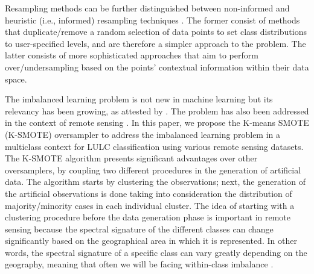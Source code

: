 \documentclass[remotesensing,article,submit,moreauthors,pdftex]{Definitions/mdpi}
\begin{document}
Resampling methods can be further distinguished between non-informed and
heuristic (i.e., informed) resampling techniques
\cite{Fernandez2013,Luengo2020,Garcia2016}. The former consist of methods that
duplicate/remove a random selection of data points to set class distributions to
user-specified levels, and are therefore a simpler approach to the problem. The
latter consists of more sophisticated approaches that aim to perform
over/undersampling based on the points' contextual information within their data
space.

The imbalanced learning problem is not new in machine learning but its
relevancy has been growing, as attested by \cite{Haixiang2017}. The problem
has also been addressed in the context of remote sensing \cite{Douzas2019rs}.
In this paper, we propose the K-means SMOTE (K-SMOTE) \cite{Douzas2018}
oversampler to address the imbalanced learning problem in a multiclass context
for LULC classification using various remote sensing datasets. The K-SMOTE
algorithm presents significant advantages over other oversamplers, by coupling
two different procedures in the generation of artificial data. The algorithm
starts by clustering the observations; next, the generation of the artificial
observations is done taking into consideration the distribution of
majority/minority cases in each individual cluster. The idea of starting with
a clustering procedure before the data generation phase is important in
remote sensing because the spectral signature of the different classes can
change significantly based on the geographical area in which it is represented.
In other words, the spectral signature of a specific class can vary greatly
depending on the geography, meaning that often we will be facing within-class
imbalance \cite{Japkowicz2001}.
\end{document}
